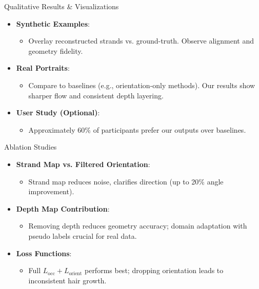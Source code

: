 \begin{frame}[t]{Qualitative Results \& Visualizations}
    \begin{itemize}
        \item \textbf{Synthetic Examples}:
        \begin{itemize}
            \item Overlay reconstructed strands vs. ground-truth. Observe alignment and geometry fidelity.
        \end{itemize}
        \item \textbf{Real Portraits}:
        \begin{itemize}
            \item Compare to baselines (e.g., orientation-only methods). Our results show sharper flow and consistent depth layering.
        \end{itemize}
        \item \textbf{User Study (Optional)}:
        \begin{itemize}
            \item Approximately 60\% of participants prefer our outputs over baselines.
        \end{itemize}
    \end{itemize}
\end{frame}

\begin{frame}[t]{Ablation Studies}
    \begin{itemize}
        \item \textbf{Strand Map vs. Filtered Orientation}:
        \begin{itemize}
            \item Strand map reduces noise, clarifies direction (up to 20\% angle improvement).
        \end{itemize}
        \item \textbf{Depth Map Contribution}:
        \begin{itemize}
            \item Removing depth reduces geometry accuracy; domain adaptation with pseudo labels crucial for real data.
        \end{itemize}
        \item \textbf{Loss Functions}:
        \begin{itemize}
            \item Full $L_{\mathrm{occ}} + L_{\mathrm{orient}}$ performs best; dropping orientation leads to inconsistent hair growth.
        \end{itemize}
    \end{itemize}
\end{frame}

